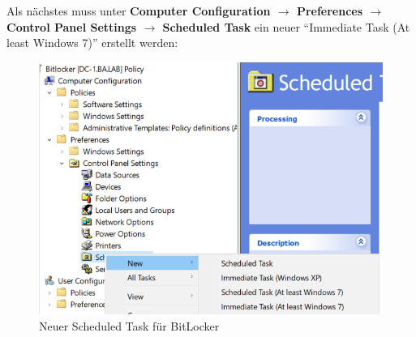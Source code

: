 Als nächstes muss unter \textbf{Computer Configuration $\rightarrow$ Preferences $\rightarrow$ Control Panel Settings $\rightarrow$ Scheduled Task} ein neuer ``Immediate Task (At least Windows 7)'' erstellt werden:
\begin{figure}[H]
    \centering
    \includegraphics[width=\linewidth]{../img/Encryption/new-scheduled-task.png}
    \caption{Neuer Scheduled Task für BitLocker}
\end{figure}

